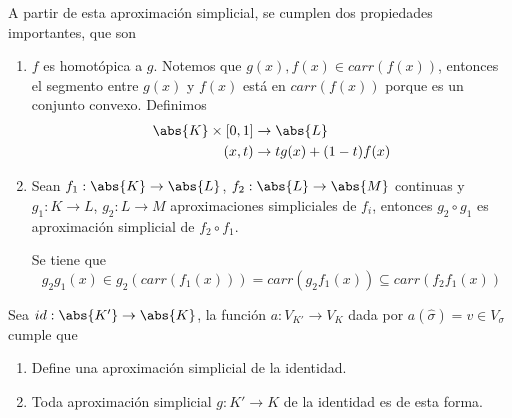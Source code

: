 \documentclass{article}
\begin{document}
\noindent A partir de esta aproximación simplicial, se cumplen dos propiedades importantes, que 
son
\begin{enumerate}
    \item $f$ es homotópica a $g$. Notemos que $g(x),f(x)\in carr(f(x))$, entonces el segmento 
    entre $g(x)$ y $f(x)$ está en $carr(f(x))$ porque es un conjunto convexo. Definimos
    \begin{align*}
        \abs{K}\times[0,1] &\to \abs{L}\\
        (x,t) &\to tg(x)+(1-t)f(x)
    \end{align*}

    \item Sean $f_{1}:\abs{K}\to\abs{L}$, $f_{2}:\abs{L}\to\abs{M}$ continuas y $g_{1}:K\to L$, 
    $g_{2}:L\to M$ aproximaciones simpliciales de $f_{i}$, entonces $g_{2}\circ g_{1}$ es
    aproximación simplicial de $f_{2}\circ f_{1}$.

    Se tiene que
    \begin{equation*}
        g_{2}g_{1}(x)\in g_{2}(carr(f_{1}(x)))=carr(g_{2}f_{1}(x))\subseteq carr(f_{2}f_{1}(x))
    \end{equation*}
\end{enumerate}

\begin{prop}
    Sea $id:\abs{K'}\to\abs{K}$, la función $a:V_{K'}\to V_{K}$ dada por 
    $a(\hat{\sigma})=v\in V_{\sigma}$ cumple que
    \begin{enumerate}
        \item Define una aproximación simplicial de la identidad.
        \item Toda aproximación simplicial $g:K'\to K$ de la identidad es de esta forma.
    \end{enumerate}
\end{prop}
\end{document}
